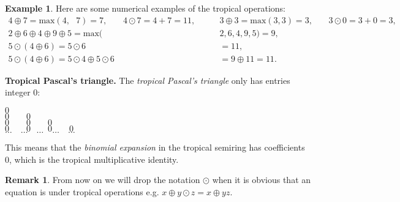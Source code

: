 \documentclass[]{article}
\theoremstyle{definition}
\numberwithin{equation}{section}
\newtheorem{examp}[thm]{Example}
\newtheorem{rmk}[thm]{Remark}
\renewcommand{\.}{\,.}
\begin{document}
\begin{examp}
	Here are some numerical examples of the tropical operations:
	\begin{align}  4 \oplus 7  =\textrm{max}(4,\textrm{ }7)=7 \textrm{,} \quad \quad 4 \odot 7 = 4+7= 11,\quad \quad &3 \oplus 3  = \textrm{max}(3, 3)=3 \textrm{,} \quad \quad 3 \odot 0 =3+0= 3, \nonumber 
		\\2 \oplus 6\oplus4 \oplus 9\oplus 5=\textrm{max}(&2,6,4,9,5)=9, \nonumber
		\\5\odot (4 \oplus 6)  = 5 \odot 6&= 11, \nonumber
		\\5\odot (4 \oplus 6) = 5\odot 4 \oplus 5  \odot 6&= 9 \oplus 11= 11. \nonumber
	\end{align}
\end{examp}
\newpage
 \hspace{3mm} \textbf{Tropical Pascal's triangle.} The \emph{tropical Pascal's triangle} only has entries integer 0: \vspace{-5mm} 
		\begin{center}$0$\\ \vspace{-1.7mm} 
		$0 \quad \quad 0$ \\ \vspace{-1.7mm} 
		$0 \quad\quad 0\quad\quad 0$ \\ \vspace{-1.7mm} 
		$0 \quad\quad 0\quad\quad 0\quad\quad 0$ \\ \vspace{-1.7mm} 
	$\ldots \quad \ldots \quad \ldots \quad \ldots \quad \ldots$
	\end{center} \vspace{-6.4mm} 
	\hspace{3mm} This means that the \emph{binomial expansion} in the tropical semiring has coefficients 0, which is the tropical multiplicative identity.
\begin{rmk}
	From now on we will drop the notation $\odot$ when it is obvious that an equation is under tropical operations e.g. $x \oplus y\odot z = x\oplus yz$. 
\end{rmk}
\end{document}
